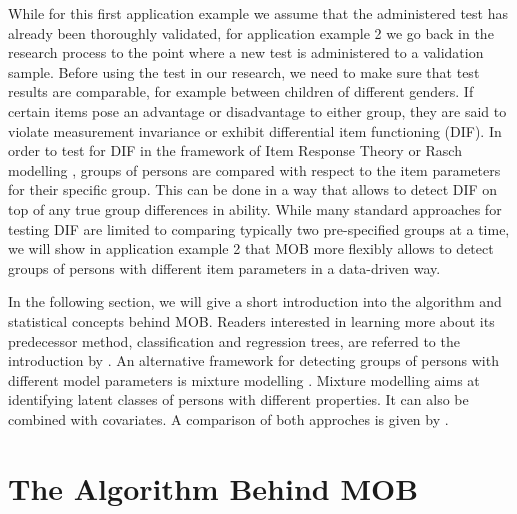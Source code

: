 \documentclass[doc,floatsintext,natbib]{apa7}
\begin{document}
While for this first application example we assume that the administered test  has already been thoroughly validated, for application example 2 we go back in the research process to the point where a new test is administered to a validation sample. Before using the test in our research, we need to make sure that test results are comparable, for example between children of different genders. If certain items pose an advantage or disadvantage to either group, they are said to violate measurement invariance or exhibit differential item functioning (DIF). In order to test for DIF in the framework of Item Response Theory or Rasch modelling \citep{AnthyDiPe16,DebStrZei:2022:CRC,Mall97}, groups of persons are compared with respect to the item parameters for their specific group. This can be done in a way that allows to detect DIF on top of any true group differences in ability. While many standard approaches for testing DIF are limited to comparing typically two pre-specified groups at a time, we will show in application example 2 that MOB more flexibly allows to detect groups of persons with different item parameters in a data-driven 
way. 

In the following section, we will give a short introduction into the algorithm and statistical concepts behind MOB. Readers interested in learning more about its predecessor method, classification and regression trees, are referred to the introduction by \citet{StrMalTut:2009:PM}. An alternative framework for detecting groups of persons with different model parameters is mixture modelling \citep[see, e.g.,][in the context of Rasch modelling]{AyalySant17,FriStrZei:2015:EaPM}. Mixture modelling aims at identifying latent classes of persons with different properties. It can also be combined with covariates. A comparison of both approches is given by \citet{FriStrZei:2014}.


\section{The Algorithm Behind MOB}
\end{document}

